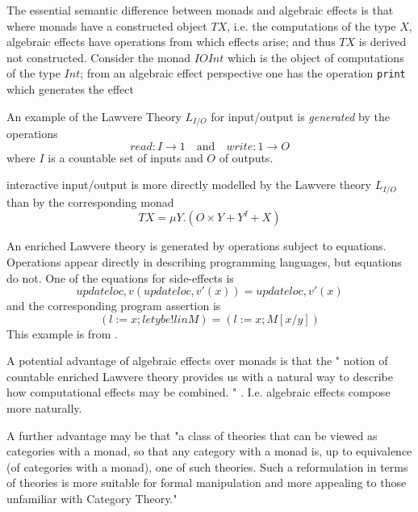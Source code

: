 The essential semantic difference between monads and algebraic effects is that
where monads have a constructed object $TX$,
i.e. the computations of the type $X$,
algebraic effects have operations from which effects arise;
and thus $TX$ is derived not constructed.
Consider the monad $IO Int$ which is the object of computations
of the type $Int$;
from an algebraic effect perspective
one has the operation \texttt{print} which generates the effect

An example of the Lawvere Theory $L_{I/O}$ for input/output is \textit{generated} by the operations
\begin{equation}
read : I \rightarrow 1 \quad\textrm{and}\quad write : 1 \rightarrow O
\end{equation}
where $I$ is a countable set of inputs and $O$ of outputs.

\cite{plotkin2001adequacy}
interactive input/output is more directly modelled
by the Lawvere theory $L_{I/O}$ than by the corresponding monad
\begin{equation}
TX = \mu Y.(O \times Y + Y^I + X)
\end{equation}

An enriched Lawvere theory is generated by operations subject to equations.
Operations appear directly in describing programming languages,
but equations do not.
One of the equations for side-effects is
\begin{equation}
    updateloc,v (updateloc,v\prime (x)) = updateloc,v\prime (x)
\end{equation}
and the corresponding program assertion is
\begin{equation}
(l := x;let y be !l in M) = (l := x;M[x/y])
\end{equation}
This example is from \cite{plotkin2001adequacy}.

A potential advantage of algebraic effects over monads is that
the "
notion of countable enriched Lawvere theory
provides us with a natural way to describe
how computational effects may be combined.
"
\cite{plotkin2004computational}.
I.e. algebraic effects compose more naturally.


A further advantage may be that
"a class of theories that can be viewed as categories with a monad,
so that
any category with a monad is, up to equivalence (of categories with a monad), one of such theories.
Such a reformulation in terms of theories is more suitable for formal manipulation and more appealing to those unfamiliar with Category Theory."
\cite{moggi1991notions}


